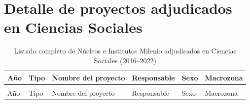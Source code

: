 \documentclass[
  spanish,
  a4paper,
  oneside]{scrbook}
\begin{document}
\section{Detalle de proyectos adjudicados en Ciencias
Sociales}\label{detalle-de-proyectos-adjudicados-en-ciencias-sociales}

\begingroup\fontsize{9}{11}\selectfont

\begin{longtable}[t]{>{\centering\arraybackslash}p{1cm}>{\centering\arraybackslash}p{1.5cm}>{\raggedright\arraybackslash}p{5cm}>{\raggedright\arraybackslash}p{3.5cm}>{\centering\arraybackslash}p{1cm}>{\centering\arraybackslash}p{2cm}}

\caption{\label{tbl-milenio-detalle}Listado completo de Núcleos e
Institutos Milenio adjudicados en Ciencias Sociales (2016--2022)}

\tabularnewline

\toprule
Año & Tipo & Nombre del proyecto & Responsable & Sexo & Macrozona\\
\midrule
\endfirsthead
\multicolumn{6}{@{}l}{\textit{(continued)}}\\
\toprule
Año & Tipo & Nombre del proyecto & Responsable & Sexo & Macrozona\\
\midrule
\endhead


\end{longtable}
\end{document}
